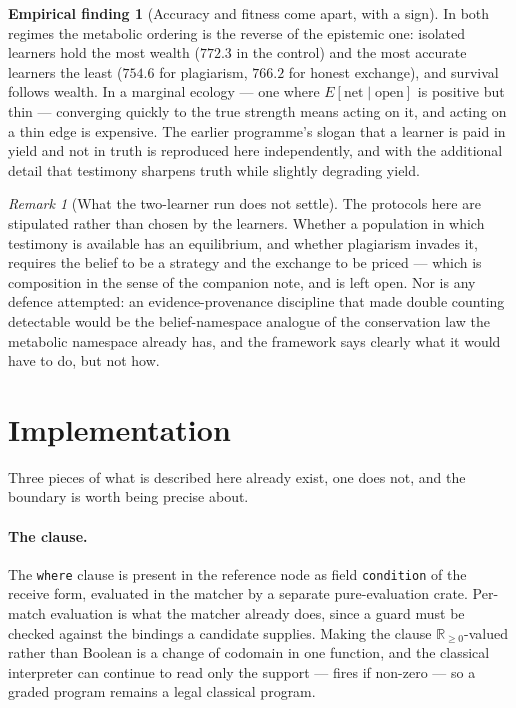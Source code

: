 \documentclass[11pt,a4paper]{article}
\theoremstyle{plain}
\theoremstyle{definition}
\newtheorem{finding}[theorem]{Empirical finding}
\theoremstyle{remark}
\newtheorem{remark}[theorem]{Remark}
\newcommand{\Rnn}{\mathbb{R}_{\geq 0}}
\begin{document}
\begin{finding}[Accuracy and fitness come apart, with a sign]\label{find:apart}
In both regimes the metabolic ordering is the reverse of the epistemic one:
isolated learners hold the most wealth ($772.3$ in the control) and the most
accurate learners the least ($754.6$ for plagiarism, $766.2$ for honest exchange),
and survival follows wealth. In a marginal ecology --- one where
$E[\text{net}\mid\text{open}]$ is positive but thin --- converging quickly to the
true strength means acting on it, and acting on a thin edge is expensive. The
earlier programme's slogan that a learner is paid in yield and not in truth is
reproduced here independently, and with the additional detail that testimony
sharpens truth while slightly degrading yield.
\end{finding}

\begin{remark}[What the two-learner run does not settle]\label{rem:testimonyopen}
The protocols here are stipulated rather than chosen by the learners. Whether a
population in which testimony is available has an equilibrium, and whether
plagiarism invades it, requires the belief to be a strategy and the exchange to be
priced --- which is composition in the sense of the companion note, and is left
open. Nor is any defence attempted: an evidence-provenance discipline that made
double counting detectable would be the belief-namespace analogue of the
conservation law the metabolic namespace already has, and the framework says
clearly what it would have to do, but not how.
\end{remark}

\section{Implementation}\label{sec:impl}

Three pieces of what is described here already exist, one does not, and the
boundary is worth being precise about.

\paragraph{The clause.} The \texttt{where} clause is present in the reference
node as field \texttt{condition} of the receive form, evaluated in the matcher by
a separate pure-evaluation crate. Per-match evaluation is what the matcher
already does, since a guard must be checked against the bindings a candidate
supplies. Making the clause $\Rnn$-valued rather than Boolean is a change of
codomain in one function, and the classical interpreter can continue to read only
the support --- fires if non-zero --- so a graded program remains a legal
classical program.
\end{document}
